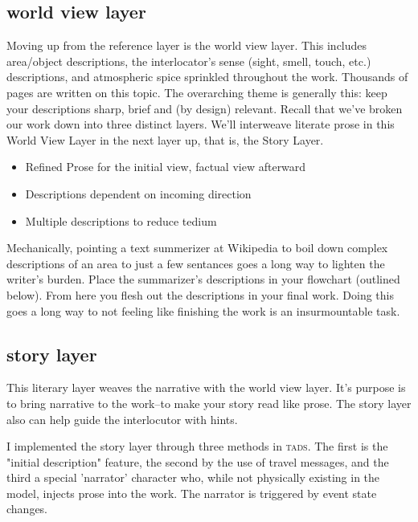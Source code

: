 \subsection{world view layer}
\noindent Moving up from the reference layer is the world view layer. This includes area/object descriptions, the interlocator's sense (sight, smell, touch, etc.) descriptions, and atmospheric spice sprinkled throughout the work.
Thousands of pages are written on this topic. The overarching theme is generally this: keep your descriptions sharp, brief and (by design) relevant. Recall that we've broken our work down into three distinct layers. We'll interweave literate prose in this World View Layer in the next layer up, that is, the Story Layer.

\begin{itemize}
  \item{Refined Prose for the initial view, factual view afterward}
  \item{Descriptions dependent on incoming direction}
  \item{Multiple descriptions to reduce tedium}
\end{itemize}
Mechanically, pointing a text summerizer at Wikipedia to boil down complex descriptions of an area to just a few sentances goes a long way to lighten the writer's burden. Place the summarizer's descriptions in your flowchart (outlined below). From here you flesh out the descriptions in your final work. Doing this goes a long way to not feeling like finishing the work is an insurmountable task.

\subsection{story layer}
\label{sec:story_layer}
This literary layer weaves the narrative with the world view layer. It's purpose is to bring narrative to the work--to make your story read like prose. The story layer also can help guide the interlocutor with hints.

\reversemarginpar
{}

I implemented the story layer through three methods in \textsc{tads}. The first is the "initial description" feature, the second by the use of travel messages, and the third a special 'narrator' character who, while not physically existing in the model, injects prose into the work. The narrator is triggered by event state changes.

